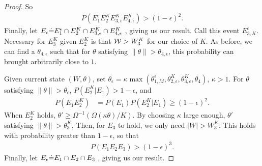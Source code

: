 \begin{proof}
{So \begin{align*}
P(E_1^\epsilon E_2^K E_{3,\epsilon}^K E_{4,\epsilon}^K) > (1- \epsilon)^2.
\end{align*} 
Finally, let $E_\epsilon {\doteq} E_1^\epsilon \cap E_2^K \cap E_{3,\epsilon}^K \cap E_{4,\epsilon}^K$ , giving us our result.
}
Call this event $E_{3,K}^\epsilon$. Necessary for $E_3^{K}$ given $E_2^{K}$ is that
${\mathcal W} > W^K_3$ for our choice of $K$. As before, we can find a $\theta_{4,\epsilon}$
such that for $\theta$ satisfying $ \| \theta \|  > \theta_{4,\epsilon}$, this probability can brought arbitrarily close to $1$.



Given current state $(W, \theta)$, set $\theta_\epsilon =
\kappa \max(\theta_{1, M}^\epsilon,\theta^K_{2, \epsilon},\theta^K_{3, \epsilon}, \theta_4)$, $\kappa > 1$.
For $\theta$ satisfying $ \| \theta \| > \theta_\epsilon$, $P(E^K_2 | E_1)>1-\epsilon$, and
\begin{align*}
P(E_1E^K_2) %
& = P(E_1) P(E^K_2|E_1) \ge (1 - \epsilon)^2.
\end{align*}
When $E^K_2$ holds, $\theta' \ge \Omega^{-1}(\Omega(\kappa\theta)/K)$.
By choosing $\kappa$ large enough, $\theta'$ satisfying $ \| \theta \| > \theta^K_3$. Then, for
$E_3$ to hold, we only need $|W| > W^K_3$. This holds with probability
greater than $1-\epsilon$, so that
\begin{align*}
  P(E_1E_2E_3) > (1- \epsilon)^3.
\end{align*}
Finally, let $E_\epsilon {\doteq} E_1\cap E_2 \cap E_3$ , giving us our result.


\end{proof}
